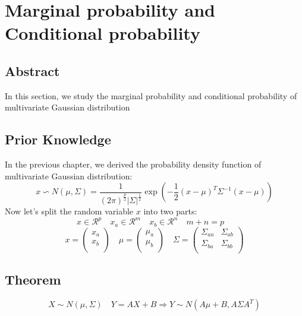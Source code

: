 \documentclass{report}
\begin{document}
\chapter{Marginal probability and Conditional probability}
\section{Abstract}
In this section, we study the marginal probability and conditional probability of multivariate Gaussian distribution
\section{Prior Knowledge}
In the previous chapter, we derived the probability density function of multivariate Gaussian distribution:
$$
x \backsim N(\mu, \Sigma) = \frac{1}{(2\pi)^{\frac{p}{2}}|\Sigma|^\frac{1}{2}}\exp(-\frac{1}{2}(x-\mu)^T \Sigma^{-1}(x-\mu))
$$
Now let's split the random variable $x$ into two parts:
$$
x \in \mathcal{R}^p \quad x_a \in \mathcal{R}^m \quad x_b \in \mathcal{R}^n \quad m+n=p \quad 
$$
$$
x = 
\left (
\begin{matrix}
x_a \\
x_b \\
\end{matrix}
\right )
\quad 
\mu = 
\left (
\begin{matrix}
\mu_a \\
\mu_b \\
\end{matrix}
\right ) \quad
\Sigma=
\left (
\begin{matrix}
\Sigma_{aa} & \Sigma_{ab}\\
\Sigma_{ba} & \Sigma_{bb}\\
\end{matrix}
\right )
$$
\section{Theorem}
$$
X \sim N(\mu, \Sigma) \quad Y=AX+B  \Longrightarrow Y \sim N(A\mu+B, A \Sigma A^T)
$$
\end{document}
